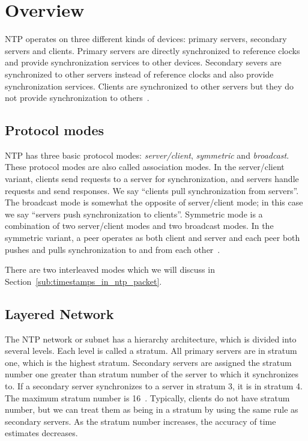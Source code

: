 
\chapter{Overview}
NTP operates on three different kinds of devices: primary servers, secondary
servers and clients. Primary servers are directly synchronized to reference
clocks and provide synchronization services to other devices.  Secondary severs
are synchronized to other servers instead of reference clocks and also provide
synchronization services. Clients are synchronized to other servers but they do
not provide synchronization to others~\cite{rfc5905}.

\section{Protocol modes}%
\label{sec:protocol_modes}
NTP has three basic protocol modes: \emph{server/client}, \emph{symmetric}
and \emph{broadcast}. These protocol modes are also called association modes. 
In the server/client variant, clients send requests to a server for
synchronization, and servers handle requests and send responses. We say
``clients pull synchronization from servers''. The broadcast mode is somewhat
the opposite of server/client mode; in this case we say ``servers push
synchronization to clients''. Symmetric mode is a combination of two
server/client modes and two broadcast modes. In the symmetric variant, a peer
operates as both client and server and each peer both pushes and pulls
synchronization to and from each other~\cite{rfc5905}.

There are two interleaved modes which we will discuss in
Section~\ref{sub:timestamps_in_ntp_packet}.

\section{Layered Network}
\label{sec:Layered_network}
The NTP network or subnet has a hierarchy architecture, which is divided into
several levels. Each level is called a stratum. All primary servers are in
stratum one, which is the highest stratum. Secondary servers are assigned the
stratum number one greater than stratum number of the server to which it
synchronizes to. If a secondary server synchronizes to a server in stratum 3,
it is in stratum 4. The maximum stratum number is 16~\cite{rfc5905}.
Typically, clients do not have stratum number, but we can treat them as being
in a stratum by using the same rule as secondary servers.  As the stratum
number increases, the accuracy of time estimates decreases.

